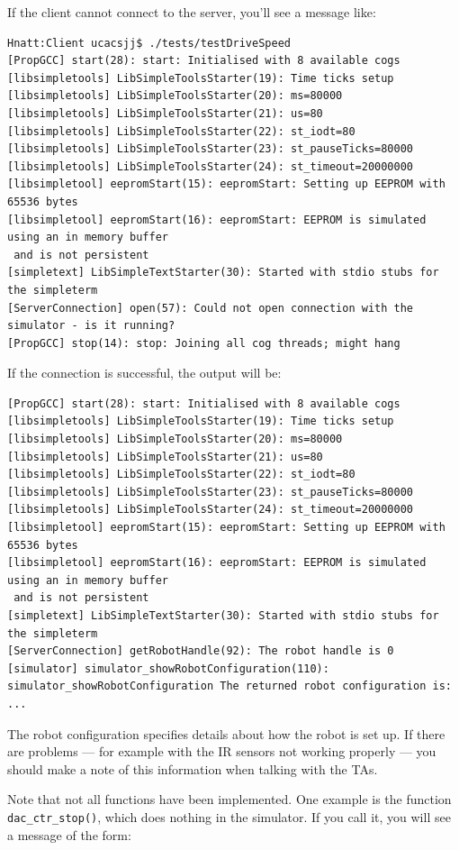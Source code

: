 \documentclass[a4paper]{article}
\begin{document}
If the client cannot connect to the server, you'll see a message like:

\begin{verbatim}
Hnatt:Client ucacsjj$ ./tests/testDriveSpeed 
[PropGCC] start(28): start: Initialised with 8 available cogs
[libsimpletools] LibSimpleToolsStarter(19): Time ticks setup
[libsimpletools] LibSimpleToolsStarter(20): ms=80000
[libsimpletools] LibSimpleToolsStarter(21): us=80
[libsimpletools] LibSimpleToolsStarter(22): st_iodt=80
[libsimpletools] LibSimpleToolsStarter(23): st_pauseTicks=80000
[libsimpletools] LibSimpleToolsStarter(24): st_timeout=20000000
[libsimpletool] eepromStart(15): eepromStart: Setting up EEPROM with 65536 bytes
[libsimpletool] eepromStart(16): eepromStart: EEPROM is simulated using an in memory buffer
 and is not persistent
[simpletext] LibSimpleTextStarter(30): Started with stdio stubs for the simpleterm
[ServerConnection] open(57): Could not open connection with the simulator - is it running?
[PropGCC] stop(14): stop: Joining all cog threads; might hang
\end{verbatim}

If the connection is successful, the output will be:

\begin{verbatim}
[PropGCC] start(28): start: Initialised with 8 available cogs
[libsimpletools] LibSimpleToolsStarter(19): Time ticks setup
[libsimpletools] LibSimpleToolsStarter(20): ms=80000
[libsimpletools] LibSimpleToolsStarter(21): us=80
[libsimpletools] LibSimpleToolsStarter(22): st_iodt=80
[libsimpletools] LibSimpleToolsStarter(23): st_pauseTicks=80000
[libsimpletools] LibSimpleToolsStarter(24): st_timeout=20000000
[libsimpletool] eepromStart(15): eepromStart: Setting up EEPROM with 65536 bytes
[libsimpletool] eepromStart(16): eepromStart: EEPROM is simulated using an in memory buffer
 and is not persistent
[simpletext] LibSimpleTextStarter(30): Started with stdio stubs for the simpleterm
[ServerConnection] getRobotHandle(92): The robot handle is 0
[simulator] simulator_showRobotConfiguration(110): simulator_showRobotConfiguration The returned robot configuration is:
...
\end{verbatim}

The robot configuration specifies details about how the robot is set up. If
there are problems --- for example with the IR sensors not working properly ---
you should make a note of this information when talking with the TAs.

Note that not all functions have been implemented. One example is the
function \verb+dac_ctr_stop()+, which does nothing in the
simulator. If you call it, you will see a message of the form:
\end{document}
